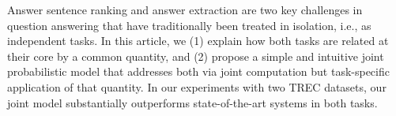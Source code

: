 Answer sentence ranking and answer extraction are two key challenges in question answering that have traditionally been treated in isolation, i.e., as independent tasks.  In this article, we (1) explain how both tasks are related at their core by a common quantity, and (2) propose a simple and intuitive joint probabilistic model that addresses both via joint computation but task-specific application of that quantity. In our experiments with two TREC datasets, our joint model substantially outperforms state-of-the-art systems in both tasks.